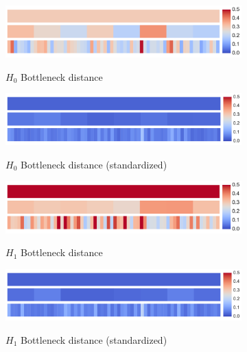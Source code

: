 \documentclass[12pt]{article}
\begin{document}
\begin{figure}[htp!]
  \centering
  \begin{subfigure}{.48\textwidth}
    \centering
    \caption{$H_0$ Bottleneck distance}
    \includegraphics[width=\linewidth]{fig_12_hmap_dim0_nonorm.pdf}
    \label{fig:cubeHeatmap0}
  \end{subfigure}
  \begin{subfigure}{.48\textwidth}
    \centering
    \caption{$H_0$ Bottleneck distance (standardized)}
    \includegraphics[width=\linewidth]{fig_12_hmap_dim0_yesnorm.pdf}
    \label{fig:cubeHeatmapStand0}
  \end{subfigure}
  \begin{subfigure}{.48\textwidth}
    \centering
    \caption{$H_1$ Bottleneck distance}
    \includegraphics[width=\linewidth]{fig_12_hmap_dim1_nonorm.pdf}
    \label{fig:cubeHeatmap1}
  \end{subfigure}
  \begin{subfigure}{.48\textwidth}
    \centering
    \caption{$H_1$ Bottleneck distance (standardized)}
    \includegraphics[width=\linewidth]{fig_12_hmap_dim1_yesnorm.pdf}
    \label{fig:cubeHeatmapStand1}
  \end{subfigure}
  \begin{subfigure}{.48\textwidth}

\end{subfigure}
\end{figure}
\end{document}
